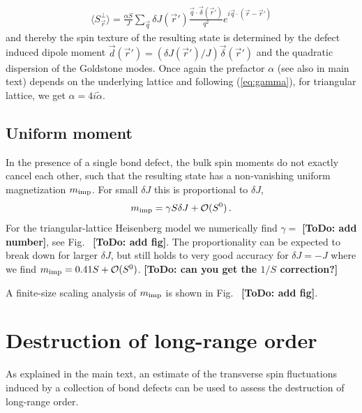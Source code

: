 \documentclass[twocolumn,english,aps,prl,floatfix]{revtex4-1}
\newcommand{\mimp}{m_{\rm imp}}
\newcommand{\todo}[1]{{\color{red} {\bf [ToDo: #1]}}}
\begin{document}
\begin{align}\label{eq:tr_resp}
    \langle S_{\vec{r}}^\perp\rangle = \frac{\alpha S}{J}
    \sum_{\vec{q}}
    \delta J(\vec{r}')
    \frac{\vec{q}\cdot\vec{\delta}(\vec{r}')}{q^2}
    e^{i\vec{q}\cdot(\vec{r}-\vec{r}')}
\end{align}
and thereby the spin texture of the resulting state is 
determined by the defect induced dipole moment 
$\vec{d}(\vec{r}')=
(\delta J(\vec{r}')/J)\vec{\delta}
(\vec{r}')$ and the quadratic dispersion of the Goldstone 
modes. Once again the prefactor $\alpha$ (see also in main 
text) depends on the underlying lattice and following 
(\ref{eq:gamma}), for triangular lattice, we get 
$\alpha=4i\tilde{\alpha}$.

\subsection{Uniform moment}

In the presence of a single bond defect, the bulk spin moments do 
not exactly cancel each other, such that the resulting state has a 
non-vanishing uniform magnetization $\mimp$. For small $\delta J$ 
this is proportional to $\delta J$,
\begin{equation}
    \mimp = \gamma S \delta J + \mathcal{O}(S^0)\,.
\end{equation}
For the triangular-lattice Heisenberg model we numerically find 
$\gamma = $ \todo{add number}, see Fig.~\todo{add fig}. The 
proportionality can be expected to break down for larger $\delta J$, 
but still holds to very good accuracy for $\delta J=-J$ where we 
find $\mimp = 0.41 S + \mathcal{O}(S^0)$.
\todo{can you get the $1/S$ correction?}

A finite-size scaling analysis of $\mimp$ is shown in 
Fig.~\todo{add fig}.



\section{Destruction of long-range order}

As explained in the main text, an estimate of the transverse spin 
fluctuations induced by a collection of bond defects can be used to 
assess the destruction of long-range order.
\end{document}
